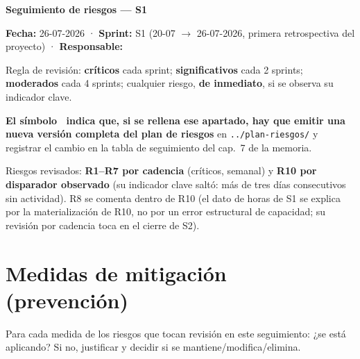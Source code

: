\documentclass[11pt,a4paper]{article}
\begin{document}
\begin{center}
  {\LARGE\bfseries Seguimiento de riesgos — S1}\\[6pt]
\end{center}

\textbf{Fecha:} 26-07-2026 · \textbf{Sprint:} S1 (20-07 \(\to\) 26-07-2026, primera retrospectiva del proyecto) · \textbf{Responsable:} \thesisAuthor

Regla de revisión: \textbf{críticos} cada sprint; \textbf{significativos} cada 2 sprints; \textbf{moderados} cada 4 sprints; cualquier riesgo, \textbf{de inmediato}, si se observa su indicador clave.

\textbf{El símbolo \updatesymbol\ indica que, si se rellena ese apartado, hay que emitir una nueva versión completa del plan de riesgos} en \texttt{../plan-riesgos/} y registrar el cambio en la tabla de seguimiento del cap.~7 de la memoria.

Riesgos revisados: \textbf{R1–R7 por cadencia} (críticos, semanal) y \textbf{R10 por disparador observado} (su indicador clave saltó: más de tres días consecutivos sin actividad).
R8 se comenta dentro de R10 (el dato de horas de S1 se explica por la materialización de R10, no por un error estructural de capacidad; su revisión por cadencia toca en el cierre de S2).

\bigline

\section{Medidas de mitigación (prevención)}

Para cada medida de los riesgos que tocan revisión en este seguimiento: ¿se está aplicando?
Si no, justificar y decidir si se mantiene/modifica/elimina.
\end{document}
